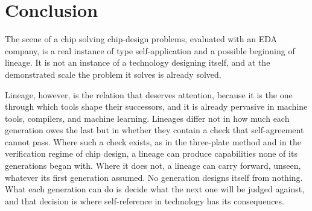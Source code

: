 \documentclass[11pt]{article}
\theoremstyle{definition}
\theoremstyle{remark}
\begin{document}
\section{Conclusion}

The scene of a chip solving chip-design problems, evaluated with an EDA company, is a real instance of type self-application and a possible beginning of lineage. It is not an instance of a technology designing itself, and at the demonstrated scale the problem it solves is already solved.

Lineage, however, is the relation that deserves attention, because it is the one through which tools shape their successors, and it is already pervasive in machine tools, compilers, and machine learning. Lineages differ not in how much each generation owes the last but in whether they contain a check that self-agreement cannot pass. Where such a check exists, as in the three-plate method and in the verification regime of chip design, a lineage can produce capabilities none of its generations began with. Where it does not, a lineage can carry forward, unseen, whatever its first generation assumed. No generation designs itself from nothing. What each generation can do is decide what the next one will be judged against, and that decision is where self-reference in technology has its consequences.
\end{document}
